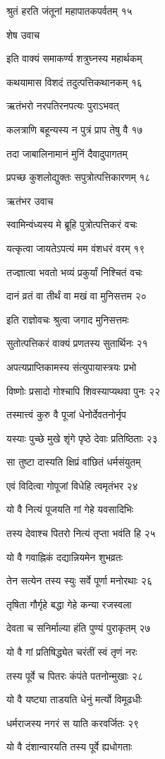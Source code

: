 श्रुतं हरति जंतूनां महापातकपर्वतम् १५

शेष उवाच

इति वाक्यं समाकर्ण्य शत्रुघ्नस्य महार्थकम्

कथयामास विशदं तदुत्पत्तिकथानकम् १६

ऋतंभरो नरपतिरनपत्यः पुराऽभवत्

कलत्राणि बहून्यस्य न पुत्रं प्राप तेषु वै १७

तदा जाबालिनामानं मुनिं दैवादुपागतम्

प्रपच्छ कुशलोद्युक्तः सपुत्रोत्पत्तिकारणम् १८

ऋतंभर उवाच

स्वामिन्वंध्यस्य मे ब्रूहि पुत्रोत्पत्तिकरं वचः

यत्कृत्वा जायतेऽपत्यं मम वंशधरं वरम् १९

तज्ज्ञात्वा भवतो भव्यं प्रकुर्यां निश्चितं वचः

दानं व्रतं वा तीर्थं वा मखं वा मुनिसत्तम २०

इति राज्ञोवचः श्रुत्वा जगाद मुनिसत्तमः

सुतोत्पत्तिकरं वाक्यं प्रणतस्य सुतार्थिनः २१

अपत्यप्राप्तिकामस्य संत्युपायास्त्रयः प्रभो

विष्णोः प्रसादो गोश्चापि शिवस्याप्यथवा पुनः २२

तस्मात्त्वं कुरु वै पूजां धेनोर्देवतनोर्नृप

यस्याः पुच्छे मुखे शृंगे पृष्ठे देवाः प्रतिष्ठिताः २३

सा तुष्टा दास्यति क्षिप्रं वांछितं धर्मसंयुतम्

एवं विदित्वा गोपूजां विधेहि त्वमृतंभर २४

यो वै नित्यं पूजयति गां गेहे यवसादिभिः

तस्य देवाश्च पितरो नित्यं तृप्ता भवंति हि २५

यो वै गवाह्निकं दद्यान्नियमेन शुभव्रतः

तेन सत्येन तस्य स्युः सर्वे पूर्णा मनोरथाः २६

तृषिता गौर्गृहे बद्धा गेहे कन्या रजस्वला

देवता च सनिर्माल्या हंति पुण्यं पुराकृतम् २७

यो वै गां प्रतिषिद्ध्येत चरंतीं स्वं तृणं नरः

तस्य पूर्वे च पितरः कंपंते पतनोन्मुखाः २८

यो वै यष्ट्या ताडयति धेनुं मर्त्यो विमूढधीः

धर्मराजस्य नगरं स याति करवर्जितः २९

यो वै दंशान्वारयति तस्य पूर्वे ह्यधोगताः

